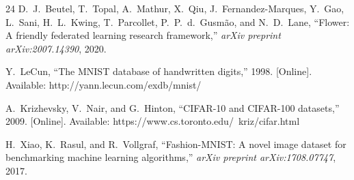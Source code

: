 \documentclass[journal]{IEEEtran}
\begin{document}
\begin{thebibliography}{24}
D.~J.~Beutel, T.~Topal, A.~Mathur, X.~Qiu, J.~Fernandez-Marques, Y.~Gao, L.~Sani, H.~L.~Kwing, T.~Parcollet, P.~P.~d.~Gusm\~{a}o, and N.~D.~Lane, ``Flower: A friendly federated learning research framework,'' \textit{arXiv preprint arXiv:2007.14390}, 2020.

Y.~LeCun, ``The MNIST database of handwritten digits,'' 1998. [Online]. Available: http://yann.lecun.com/exdb/mnist/

A.~Krizhevsky, V.~Nair, and G.~Hinton, ``CIFAR-10 and CIFAR-100 datasets,'' 2009. [Online]. Available: https://www.cs.toronto.edu/~kriz/cifar.html

H.~Xiao, K.~Rasul, and R.~Vollgraf, ``Fashion-MNIST: A novel image dataset for benchmarking machine learning algorithms,'' \textit{arXiv preprint arXiv:1708.07747}, 2017.

\end{thebibliography}
\end{document}
